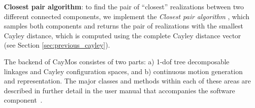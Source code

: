 \documentclass[prodmode,acmtoms]{acmsmall}
\begin{document}


\textbf{Closest pair algorithm}: 
to find the pair of ``closest'' realizations between two different connected components, 
we implement the \emph{Closest pair algorithm} \cite[Theorem 5(ii)]{sitharam2014beast},
which samples both components and returns the pair of realizations with the smallest Cayley distance, %
which is computed using the complete Cayley distance vector (see Section \ref{sec:previous_cayley}).


\medskip


The backend of CayMos consistes of two parts:
     a) 1-dof tree decomposable linkages and Cayley
        configuration spaces, and
     b) continuous motion generation and representation.
    The major classes and methods within each of these areas
    are described in further detail in the user manual that
    accompanies the software component~\cite{userman}.
\end{document}
